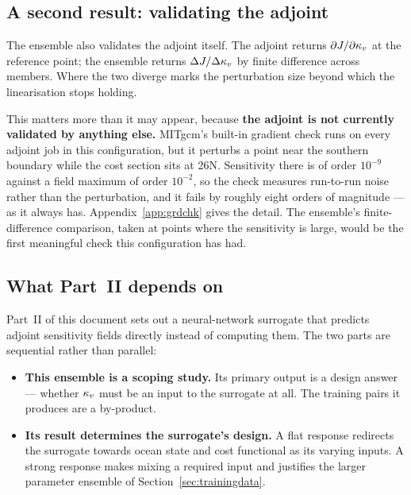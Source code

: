 \subsection{A second result: validating the adjoint}
\label{sec:validating}

The ensemble also validates the adjoint itself. The adjoint returns
$\partial J/\partial\kappa_{v}$ at the reference point; the ensemble returns
$\Delta J/\Delta\kappa_{v}$ by finite difference across members. Where the two diverge
marks the perturbation size beyond which the linearisation stops holding.

This matters more than it may appear, because \textbf{the adjoint is not
currently validated by anything else.} MITgcm's built-in gradient check runs on
every adjoint job in this configuration, but it perturbs a point near the
southern boundary while the cost section sits at 26\dg N. Sensitivity there is of
order $10^{-9}$ against a field maximum of order $10^{-2}$, so the check measures
run-to-run noise rather than the perturbation, and it fails by roughly eight
orders of magnitude --- as it always has. Appendix~\ref{app:grdchk} gives the
detail. The ensemble's finite-difference comparison, taken at points where the
sensitivity is large, would be the first meaningful check this configuration has
had.

\subsection{What Part~II depends on}
\label{sec:bridge}

Part~II of this document sets out a neural-network surrogate that predicts
adjoint sensitivity fields directly instead of computing them. The two parts are
sequential rather than parallel:

\begin{itemize}[nosep]
  \item \textbf{This ensemble is a scoping study.} Its primary output is a design
        answer --- whether $\kappa_{v}$ must be an input to the surrogate at all. The
        training pairs it produces are a by-product.
  \item \textbf{Its result determines the surrogate's design.} A flat response
        redirects the surrogate towards ocean state and cost functional as its
        varying inputs. A strong response makes mixing a required input and
        justifies the larger parameter ensemble of
        Section~\ref{sec:trainingdata}.
\end{itemize}

